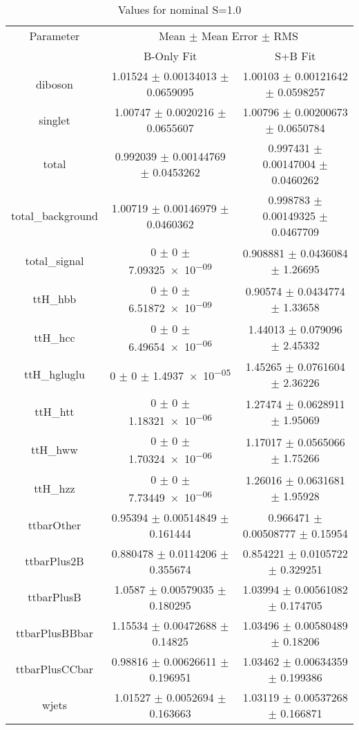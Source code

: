 \begin{table}
\centering
\caption{Values for nominal S=1.0}
\begin{tabular}{ccc}
\toprule
Parameter & \multicolumn{2}{c}{Mean $\pm$ Mean Error $\pm$ RMS}\\
 & B-Only Fit & S+B Fit\\
\midrule
diboson & \num{1.01524} $\pm$ \num{0.00134013} $\pm$ \num{0.0659095} & \num{1.00103} $\pm$ \num{0.00121642} $\pm$ \num{0.0598257}\\
singlet & \num{1.00747} $\pm$ \num{0.0020216} $\pm$ \num{0.0655607} & \num{1.00796} $\pm$ \num{0.00200673} $\pm$ \num{0.0650784}\\
total & \num{0.992039} $\pm$ \num{0.00144769} $\pm$ \num{0.0453262} & \num{0.997431} $\pm$ \num{0.00147004} $\pm$ \num{0.0460262}\\
total\_background & \num{1.00719} $\pm$ \num{0.00146979} $\pm$ \num{0.0460362} & \num{0.998783} $\pm$ \num{0.00149325} $\pm$ \num{0.0467709}\\
total\_signal & \num{0} $\pm$ \num{0} $\pm$ \num{7.09325e-09} & \num{0.908881} $\pm$ \num{0.0436084} $\pm$ \num{1.26695}\\
ttH\_hbb & \num{0} $\pm$ \num{0} $\pm$ \num{6.51872e-09} & \num{0.90574} $\pm$ \num{0.0434774} $\pm$ \num{1.33658}\\
ttH\_hcc & \num{0} $\pm$ \num{0} $\pm$ \num{6.49654e-06} & \num{1.44013} $\pm$ \num{0.079096} $\pm$ \num{2.45332}\\
ttH\_hgluglu & \num{0} $\pm$ \num{0} $\pm$ \num{1.4937e-05} & \num{1.45265} $\pm$ \num{0.0761604} $\pm$ \num{2.36226}\\
ttH\_htt & \num{0} $\pm$ \num{0} $\pm$ \num{1.18321e-06} & \num{1.27474} $\pm$ \num{0.0628911} $\pm$ \num{1.95069}\\
ttH\_hww & \num{0} $\pm$ \num{0} $\pm$ \num{1.70324e-06} & \num{1.17017} $\pm$ \num{0.0565066} $\pm$ \num{1.75266}\\
ttH\_hzz & \num{0} $\pm$ \num{0} $\pm$ \num{7.73449e-06} & \num{1.26016} $\pm$ \num{0.0631681} $\pm$ \num{1.95928}\\
ttbarOther & \num{0.95394} $\pm$ \num{0.00514849} $\pm$ \num{0.161444} & \num{0.966471} $\pm$ \num{0.00508777} $\pm$ \num{0.15954}\\
ttbarPlus2B & \num{0.880478} $\pm$ \num{0.0114206} $\pm$ \num{0.355674} & \num{0.854221} $\pm$ \num{0.0105722} $\pm$ \num{0.329251}\\
ttbarPlusB & \num{1.0587} $\pm$ \num{0.00579035} $\pm$ \num{0.180295} & \num{1.03994} $\pm$ \num{0.00561082} $\pm$ \num{0.174705}\\
ttbarPlusBBbar & \num{1.15534} $\pm$ \num{0.00472688} $\pm$ \num{0.14825} & \num{1.03496} $\pm$ \num{0.00580489} $\pm$ \num{0.18206}\\
ttbarPlusCCbar & \num{0.98816} $\pm$ \num{0.00626611} $\pm$ \num{0.196951} & \num{1.03462} $\pm$ \num{0.00634359} $\pm$ \num{0.199386}\\
wjets & \num{1.01527} $\pm$ \num{0.0052694} $\pm$ \num{0.163663} & \num{1.03119} $\pm$ \num{0.00537268} $\pm$ \num{0.166871}\\
\bottomrule
\end{tabular}
\end{table}